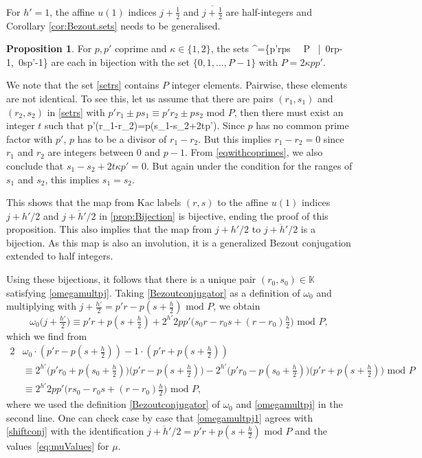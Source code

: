 \documentclass[11pt]{article}
\numberwithin{equation}{section}
\theoremstyle{definition}
\newtheorem{Proposition}{Proposition}[section]
\numberwithin{equation}{section}
\renewcommand{\le}{\leqslant}
\begin{document}
For $h'=1$, the affine $u(1)$ indices $j+\frac12$ and $\overline{j+\frac12}$ are half-integers and Corollary \ref{cor:Bezout.sets} needs to be generalised. 
\begin{Proposition}
For $p,p'$ coprime and $\kappa \in\{1, 2\}$, the sets
\be
{}^\pm=\{p'r\pm ps \ \, P \, \big|\, 0\le r\le p-1,\ 0\le s\le2\kappa p'-1\}
\label{setrs}
\ee
are each in bijection with the set $\{0, 1, \dots, P-1\}$ 
with $P=2\kappa p p'$.
\end{Proposition}
\proof 
We note that the set \eqref{setrs} contains $P$ integer elements. Pairwise, these elements
are not identical. To see this, let us assume that there are pairs
$(r_1,s_1)$ and $(r_2,s_2)$ in \eqref{setrs} with $p'r_1\pm ps_1\equiv p'r_2\pm ps_2 \textrm{ mod } P$,
then there must exist an integer $t$ such that
\be
p'(r_1-r_2)=\mp p(s_1-s_2+2t\kappa p').
\label{eqwithcoprimes}
\ee
Since $p$ has no common prime factor with $p'$, $p$ has to be a divisor of
$r_1-r_2$. But this implies $r_1-r_2=0$ since $r_1$ and $r_2$ are integers
between 0 and $p-1$. From \eqref{eqwithcoprimes}, we also conclude that 
$s_1-s_2+2t\kappa p'=0$. But again under the condition for the ranges of
$s_1$ and $s_2$, this implies $s_1=s_2$.
\eproof

This shows that the map from Kac labels $(r,s)$ to the affine $u(1)$ indices $j+h'/2$ and $\overline{j+h'/2}$ in \cref{prop:Bijection} is bijective, ending the proof of this proposition. This also implies that the map from $j+h'/2$ to $\overline{j+h'/2}$ is a bijection. As this map is also an involution, it is a generalized Bezout conjugation extended to half integers. 

Using these bijections, it follows that there is a unique pair $(r_0,s_0)\in \mathbb{K}$ satisfying \eqref{omegamultpj}. Taking \eqref{Bezoutconjugator} as a definition of $\omega_0$ and multiplying with $j+\tfrac {h'}2 =p'r-p(s+\tfrac h2) \textrm{ mod } P$, we obtain
\begin{equation}
\omega_0\big(j+\tfrac {h'}2\big)
\equiv p' r+p(s+\tfrac h2)+2^{h'}2 p p'
\big(s_0r-r_0s+(r-r_0)\tfrac h2\big) \textrm{ mod } P,
\label{omegamultpj1}
\end{equation}
which we find from
\begin{alignat}{2}
  &\omega_0\cdot(p'r-p(s+\tfrac h2))-1\cdot(p'r+p(s+\tfrac h2))\nonumber\\[0.1cm]
  &  \equiv 2^{h'}\big(p'r_0+p(s_0+\tfrac h2)\big)\big(p'r-p(s+\tfrac h2)\big)
    -  2^{h'}\big(p'r_0-p(s_0+\tfrac h2)\big)\big(p'r+p(s+\tfrac h2)\big) \textrm{ mod } P\nonumber\\[0.1cm]
  &\equiv 2^{h'}2 p p'
\big(rs_0-r_0s+(r-r_0)\tfrac h2\big) \textrm{ mod } P,
\end{alignat}    
where we used the definition \eqref{Bezoutconjugator} of $\omega_0$ and \eqref{omegamultpj} in the second line. One can check case by case that \eqref{omegamultpj1} agrees with \eqref{shiftconj} with the identification $\overline{j+h'/2}=p' r+p(s+\frac h2)\textrm{ mod } P$ and the values~\eqref{eq:muValues} for $\mu$.
\end{document}
